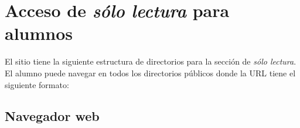 \newpage

    \section {Acceso de \textsl{s\'{o}lo lectura} para alumnos}
    \label{sec:man-ro}

El sitio tiene la siguiente estructura de directorios para la secci\'{o}n de \textit{s\'{o}lo lectura}. El alumno puede navegar en todos los directorios p\'{u}blicos donde la \textsc{URL} tiene el siguiente formato:

{
 \linespread{1}
 \begin{table}[H]
 \caption{Formato de la \textsc{URL} de la secci\'{o}n de \textit{s\'{o}lo lectura}}{}
 \label{tab:csv-format}
 \noindent{} %
 \end{table}
}

      \subsection {Navegador web}
      \label{subsec:man-ro-browser}

